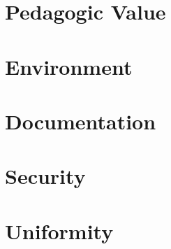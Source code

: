 \section{Pedagogic Value}


\section{Environment}


\section{Documentation}


\section{Security}


\section{Uniformity}

